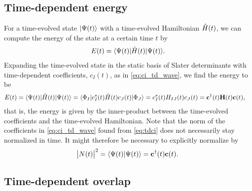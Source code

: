        \subsection{Time-dependent energy}
            For a time-evolved state $| \Psi(t) \rangle$ with a time-evolved
            Hamiltonian $\hat{H}(t)$, we can compute the energy of the state at a
            certain time $t$ by
            \begin{align}
                E(t) = \langle \Psi(t) |\hat{H}(t)| \Psi(t) \rangle.
            \end{align}
            Expanding the time-evolved state in the static basis of Slater
            determinants with time-dependent coefficients, $c_I(t)$, as in
            \autoref{eq:ci_td_wave}, we find the energy to be
            \begin{align}
                E(t)
                &= \langle \Psi(t) |\hat{H}(t)| \Psi(t) \rangle
                = \langle \Phi_I |c^{*}_I(t) \hat{H}(t) c_J(t)| \Phi_J \rangle
                = c^{*}_I(t) H_{IJ}(t) c_J(t)
                = \mathbf{c}^{\dagger}(t)\mathbf{H}(t)\mathbf{c}(t),
            \end{align}
            that is, the energy is given by the inner-product between the
            time-evolved coefficients and the time-evolved Hamiltonian.
            Note that the norm of the coefficients in \autoref{eq:ci_td_wave}
            found from \autoref{eq:tdci} does not necessarily stay normalized in
            time.
            It might therefore be necessary to explicitly normalize by
            \begin{align}
                \abs{N(t)}^2
                = \langle \Psi(t) | \Psi(t) \rangle
                = \mathbf{c}^{\dagger}(t)\mathbf{c}(t).
            \end{align}

        \subsection{Time-dependent overlap}
